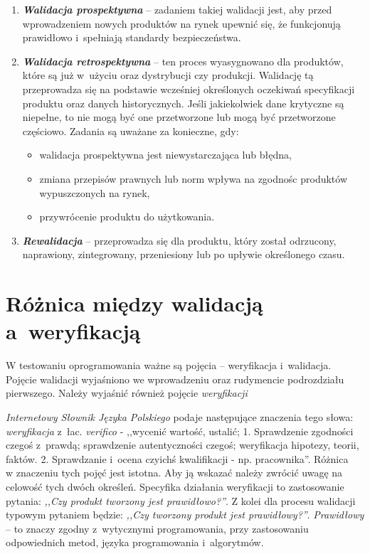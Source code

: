 \documentclass[brudnopis]{xmgr}
\begin{document}
\begin{enumerate}
  \item \textbf{\textit{Walidacja prospektywna}} – \textcolor{sa}{zadaniem takiej walidacji jest, aby przed wprowadzeniem nowych produktów na rynek upewnić się, że funkcjonują prawidłowo i~spełniają standardy bezpieczeństwa.}
  \item \textbf{\textit{Walidacja retrospektywna}} – \textcolor{sa}{ten proces wyasygnowano dla produktów, które są już w~użyciu oraz dystrybucji czy produkcji. Walidację tą przeprowadza się na podstawie wcześniej określonych oczekiwań specyfikacji produktu oraz danych historycznych. Jeśli jakiekolwiek dane krytyczne są niepełne, to nie mogą być one przetworzone lub mogą być przetworzone częściowo.} \textcolor{sb}{Zadania są uważane za konieczne, gdy:}
\begin{itemize}
\item \textcolor{sa}{walidacja prospektywna jest niewystarczająca lub błędna,}
\item \textcolor{sa}{zmiana przepisów prawnych lub norm wpływa na zgodnośc produktów wypuszczonych na rynek,}
\item \textcolor{sa}{przywrócenie produktu do użytkowania.}
\end{itemize}
  \item \textbf{\textit{Rewalidacja}} – \textcolor{sa}{przeprowadza się dla produktu, który został odrzucony, naprawiony, zintegrowany, przeniesiony lub po upływie określonego czasu.}\cite{Categories}
\end{enumerate}

\section{Różnica między walidacją a~weryfikacją}

\indent \indent \indent \textcolor{sb}{W testowaniu oprogramowania ważne są pojęcia – weryfikacja i~walidacja.} \textcolor{sa}{Pojęcie walidacji wyjaśniono we wprowadzeniu oraz rudymencie podrozdziału pierwszego.} \textcolor{sb}{Należy wyjaśnić również pojęcie \textit{weryfikacji}}

\textcolor{sa}{\textit{Internetowy Słownik Języka Polskiego} podaje następujące znaczenia tego słowa: \textit{weryfikacja} z~łac. \textit{verifico} - ,,wycenić wartość, ustalić; 1. Sprawdzenie zgodności czegoś z~prawdą; sprawdzenie autentyczności czegoś; weryfikacja hipotezy, teorii, faktów. 2. Sprawdzanie i~ocena czyichś kwalifikacji - np. pracownika''.} \textcolor{sb}{Różnica
\\
w znaczeniu tych pojęć jest istotna.} \textcolor{sa}{Aby ją wskazać należy zwrócić uwagę na celowość tych dwóch określeń.} \textcolor{sb}{Specyfika działania weryfikacji to zastosowanie pytania:} \textcolor{sa}{\textit{,,Czy produkt tworzony jest prawidłowo?''}.} \textcolor{sb}{Z kolei dla procesu walidacji typowym pytaniem będzie:} \textcolor{sa}{\textit{,,Czy tworzony produkt jest prawidłowy?''}.} \textcolor{sb}{\textit{Prawidłowy} – to znaczy} \textcolor{sa}{zgodny z~wytycznymi programowania, przy zastosowaniu odpowiednich metod, języka programowania i~algorytmów. }
\end{document}
